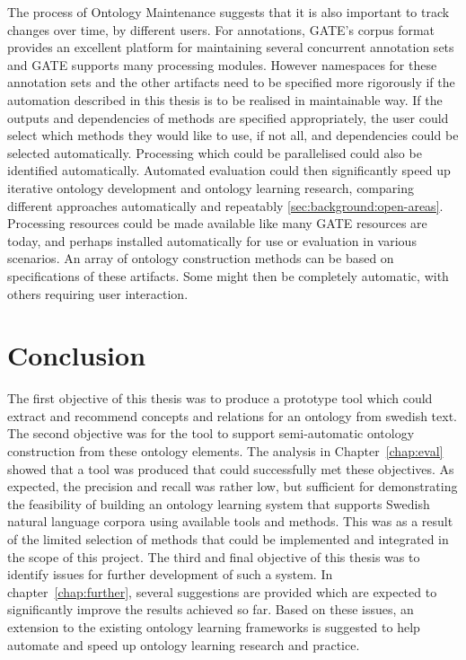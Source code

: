 \documentclass[a4paper]{report}
\begin{document}
The process of Ontology Maintenance suggests that it is also important to track changes over time, by different users.
For annotations, GATE's corpus format provides an excellent platform for maintaining several concurrent annotation sets and GATE supports many processing modules.
However namespaces for these annotation sets and the other artifacts need to be specified more rigorously if the automation described in this thesis is to be realised in maintainable way.
If the outputs and dependencies of methods are specified appropriately, the user could select which methods they would like to use, if not all, and dependencies could be selected automatically.
Processing which could be parallelised could also be identified automatically.
Automated evaluation could then significantly speed up iterative ontology development and ontology learning research, comparing different approaches automatically and repeatably \ref{sec:background:open-areas}.
Processing resources could be made available like many GATE resources are today, and perhaps installed automatically for use or evaluation in various scenarios.
An array of ontology construction methods can be based on specifications of these artifacts.
Some might then be completely automatic, with others requiring user interaction.


\chapter{Conclusion}

The first objective of this thesis was to produce a prototype tool which could extract and recommend concepts and relations for an ontology from swedish text.
The second objective was for the tool to support semi-automatic ontology construction from these ontology elements.
The analysis in Chapter~\ref{chap:eval} showed that a tool was produced that could successfully met these objectives.
As expected, the precision and recall was rather low, but sufficient for demonstrating the feasibility of building an ontology learning system that supports Swedish natural language corpora using available tools and methods.
This was as a result of the limited selection of methods that could be implemented and integrated in the scope of this project.
The third and final objective of this thesis was to identify issues for further development of such a system.
In chapter~\ref{chap:further}, several suggestions are provided which are expected to significantly improve the results achieved so far.
Based on these issues, an extension to the existing ontology learning frameworks is suggested to help automate and speed up ontology learning research and practice.
\end{document}
